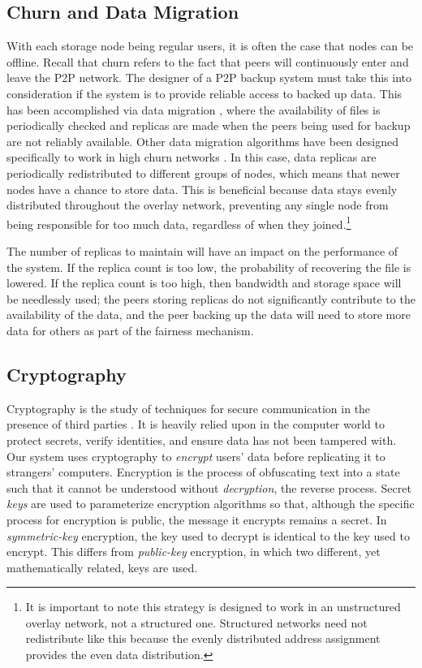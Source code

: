 \documentclass[12pt]{report}
\begin{document}
\subsection{Churn and Data Migration} \label{sec:churn}
With each storage node being regular users, it is often the case that nodes can be offline. Recall that churn refers to the fact that peers will continuously enter and leave the P2P network. The designer of a P2P backup system must take this into consideration if the system is to provide reliable access to backed up data. This has been accomplished via data migration \cite{pStore,PeerStore}, where the availability of files is periodically checked and replicas are made when the peers being used for backup are not reliably available. Other data migration algorithms have been designed specifically to work in high churn networks \cite{StorageSearchP2PNetworks}. In this case, data replicas are periodically redistributed to different groups of nodes, which means that newer nodes have a chance to store data. This is beneficial because data stays evenly distributed throughout the overlay network, preventing any single node from being responsible for too much data, regardless of when they joined.\footnote{It is important to note this strategy is designed to work in an unstructured overlay network, not a structured one. Structured networks need not redistribute like this because the evenly distributed address assignment provides the even data distribution.}

The number of replicas to maintain will have an impact on the performance of the system. If the replica count is too low, the probability of recovering the file is lowered. If the replica count is too high, then bandwidth and storage space will be needlessly used; the peers storing replicas do not significantly contribute to the availability of the data, and the peer backing up the data will need to store more data for others as part of the fairness mechanism.

\subsection{Cryptography} \label{sec:crypto}
Cryptography is the study of techniques for secure communication in the presence of third parties \cite{cryptoDef}. It is heavily relied upon in the computer world to protect secrets, verify identities, and ensure data has not been tampered with. Our system uses cryptography to \textit{encrypt} users' data before replicating it to strangers' computers. Encryption is the process of obfuscating text into a state such that it cannot be understood without \textit{decryption}, the reverse process. Secret \textit{keys} are used to parameterize encryption algorithms so that, although the specific process for encryption is public, the message it encrypts remains a secret. In \textit{symmetric-key} encryption, the key used to decrypt is identical to the key used to encrypt. This differs from \textit{public-key} encryption, in which two different, yet mathematically related, keys are used.
\end{document}
